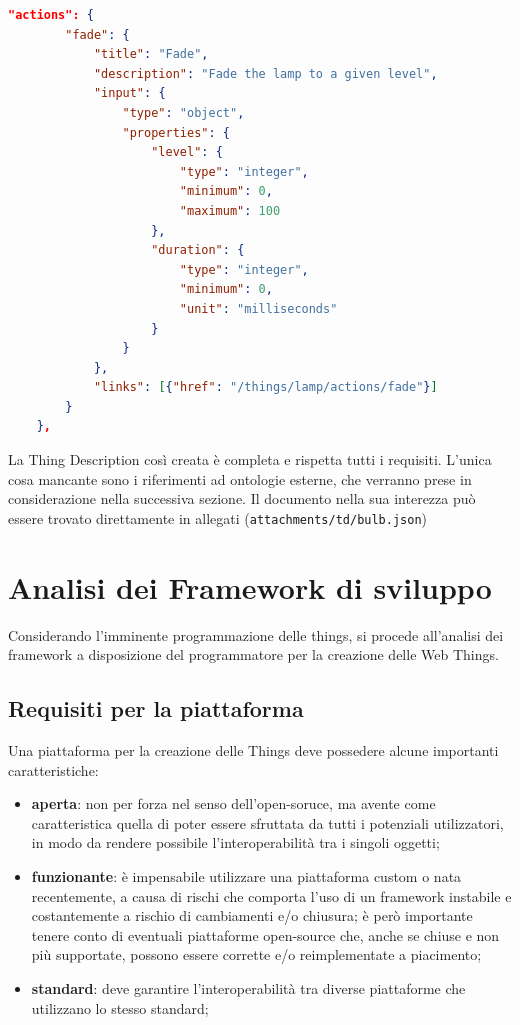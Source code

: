 \documentclass[12pt,a4paper,openright,oneside]{report}
\begin{document}
\clearpage
\begin{lstlisting}[language=json,caption={Azioni di una lampadina},label=lst:start4-td-lamp]
	"actions": {
		"fade": {
			"title": "Fade",
			"description": "Fade the lamp to a given level",
			"input": {
				"type": "object",
				"properties": {
					"level": {
						"type": "integer",
						"minimum": 0,
						"maximum": 100
					},
					"duration": {
						"type": "integer",
						"minimum": 0,
						"unit": "milliseconds"
					}
				}
			},
			"links": [{"href": "/things/lamp/actions/fade"}]
		}
	},
\end{lstlisting}

La Thing Description così creata è completa e rispetta tutti i requisiti. L'unica cosa mancante sono i riferimenti ad ontologie esterne, che verranno prese in considerazione nella successiva sezione. Il documento nella sua interezza può essere trovato direttamente in allegati (\texttt{attachments/td/bulb.json})





\clearpage{\pagestyle{empty}\cleardoublepage}
\chapter{Analisi dei Framework di sviluppo}           %
\lhead[\fancyplain{}{\bfseries\thepage}]{\fancyplain{}{\bfseries\rightmark}}  

Considerando l'imminente programmazione delle things, si procede all'analisi dei framework a disposizione del programmatore per la creazione delle Web Things.

\section{Requisiti per la piattaforma}
\label{sec:iot_platform}
Una piattaforma per la creazione delle Things deve possedere alcune importanti caratteristiche:

\begin{itemize}
	\setlength\itemsep{0em}
	\item \textbf{aperta}: non per forza nel senso dell'open-soruce, ma avente come caratteristica quella di poter essere sfruttata da tutti i potenziali utilizzatori, in modo da rendere possibile l'interoperabilità tra i singoli oggetti;

	\item \textbf{funzionante}: è impensabile utilizzare una piattaforma custom o nata recentemente, a causa di rischi che comporta l'uso di un framework instabile e costantemente a rischio di cambiamenti e/o chiusura; è però importante tenere conto di eventuali piattaforme open-source che, anche se chiuse e non più supportate, possono essere corrette e/o reimplementate a piacimento;
	
	\item \textbf{standard}: deve garantire l'interoperabilità tra diverse piattaforme che utilizzano lo stesso standard;
\end{itemize}
\end{document}

